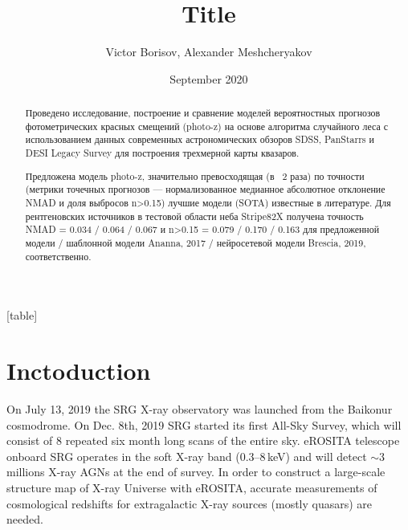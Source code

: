 \documentclass[fleqn,usenatbib]{mnras}
\title[ShortTitle]{Title}
\author[Borisov et al.]{Victor Borisov, Alexander Meshcheryakov %
}
\date{September 2020}
\begin{document}
[table]
\renewcommand{\therowcntr}{\arabic{rowcntr}}
\newcolumntype{N}{>{\refstepcounter{rowcntr}\therowcntr}c}

\maketitle
\begin{abstract}
Проведено исследование, построение и сравнение моделей вероятностных прогнозов фотометрических красных смещений (photo-z) на основе алгоритма случайного леса  с использованием данных современных астрономических обзоров SDSS, PanStarrs и DESI Legacy Survey для построения трехмерной карты квазаров.

Предложена модель photo-z, значительно превосходящая (в ~2 раза) по точности (метрики точечных прогнозов — нормализованное медианное абсолютное отклонение NMAD и доля выбросов n>0.15) лучшие модели (SOTA) известные в литературе. Для рентгеновских источников в тестовой области неба Stripe82X получена точность NMAD = 0.034 / 0.064 / 0.067 и n>0.15 = 0.079 / 0.170 / 0.163 для предложенной модели / шаблонной модели Ananna, 2017 / нейросетевой модели Brescia, 2019, соответственно.
\end{abstract}



\section{Inctoduction}

On July 13, 2019 the SRG X-ray observatory
was launched from the Baikonur cosmodrome. On Dec. 8th, 2019 SRG started its first All-Sky Survey, which will consist of 8 repeated six month long scans of the entire sky. eROSITA telescope \citep{2020arXiv201003477P} onboard SRG operates in the soft X-ray band (0.3–8\,keV) and will detect $\sim3$ millions X-ray AGNs at the end of survey. In order to construct a large-scale structure map of X-ray Universe with eROSITA, accurate measurements of cosmological redshifts for extragalactic X-ray sources (mostly quasars) are needed.
\end{document}
